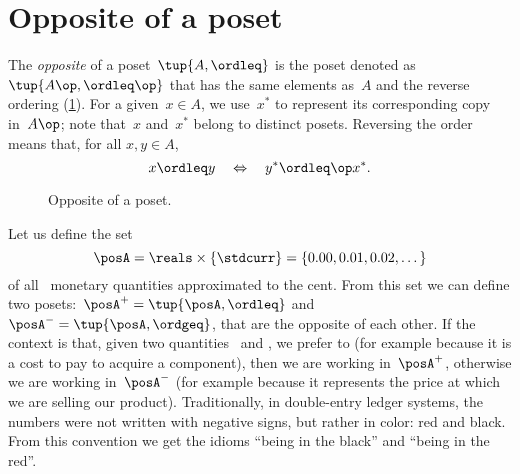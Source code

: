 

\section{Opposite of a poset}\label{sec:opposite-of-a-poset}

\begin{definition}
  \label{def:poset-opposite}
  The \emph{opposite} of a poset~$\tup{A, \ordleq} $ is the poset denoted as~$\tup{A\op, \ordleq\op}$ that has the same elements as~$A$ and the reverse ordering (\cref{fig:poset-opposite}).
  For a given~$x \in A$, we use~$x^*$ to represent its corresponding copy in~$A\op$; note that~$x$ and~$x^*$ belong to distinct posets.
  Reversing the order means that, for all $x,y\in A$,
  \begin{equation}
    x \ordleq y \quad \Leftrightarrow \quad y^* \ordleq\op x^*.
  \end{equation}
\end{definition}

\begin{figure}[tbh]
  \centering
  \caption{Opposite of a poset.}
  \label{fig:poset-opposite}
\end{figure}


\begin{example}
  Let us define the set
  \begin{equation*}
    \posA=\reals \times \{\stdcurr\}=\{0.00,0.01,0.02,\dots\}
  \end{equation*}
  of all \stdcurr \ monetary quantities approximated to the cent.
  From this set we can define two posets:~$\posA^{+} = \tup{\posA, \ordleq}$ and~$\posA^{-} = \tup{\posA, \ordgeq}$, that are the opposite of each other.
  If the context is that, given two quantities~\unit[1]{\stdcurr} and \unit[2]{\stdcurr}, we prefer \unit[1]{\stdcurr} to \unit[2]{\stdcurr} (for example because it is a cost to pay to acquire a component), then we are working in~$\posA^{+}$, otherwise we are working in~$\posA^{-}$ (for example because it represents the price at which we are selling our product).
  Traditionally, in double-entry ledger systems, the numbers were not written with negative signs, but rather in color: red and black. From this convention we get the idioms ``being in the black'' and ``being in the red''.
\end{example}
